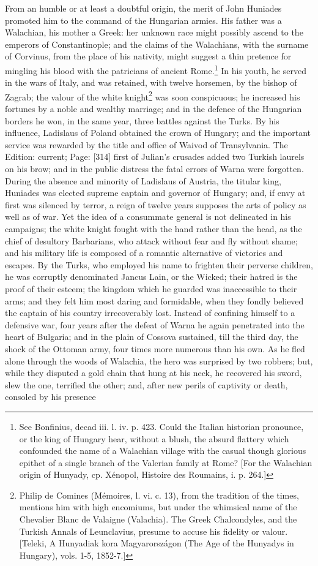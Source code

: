 From an humble or at least a doubtful origin, the merit of John Huniades promoted him to the command of the Hungarian armies. His father was a Walachian, his mother a Greek: her unknown race might possibly ascend to the emperors of Constantinople; and the claims of the Walachians, with the surname of Corvinus, from the place of his nativity, might suggest a thin pretence for mingling his blood with the patricians of ancient Rome.\footnote{See Bonfinius, decad iii. l. iv. p. 423. Could the Italian historian pronounce, or the king of Hungary hear, without a blush, the absurd flattery which confounded the name of a Walachian village with the casual though glorious epithet of a single branch of the Valerian family at Rome? [For the Walachian origin of Hunyady, cp. Xénopol, Histoire des Roumains, i. p. 264.]} In his youth, he served in the wars of Italy, and was retained, with twelve horsemen, by the bishop of Zagrab; the valour of the white knight\footnote{Philip de Comines (Mémoires, l. vi. c. 13), from the tradition of the times, mentions him with high encomiums, but under the whimsical name of the Chevalier Blanc de Valaigne (Valachia). The Greek Chalcondyles, and the Turkish Annals of Leunclavius, presume to accuse his fidelity or valour. [Teleki, A Hunyadiak kora Magyarországon (The Age of the Hunyadys in Hungary), vols. 1-5, 1852-7.]} was soon conspicuous; he increased his fortunes by a noble and wealthy marriage; and in the defence of the Hungarian borders he won, in the same year, three battles against the Turks. By his influence, Ladislaus of Poland obtained the crown of Hungary; and the important service was rewarded by the title and office of Waivod of Transylvania. The Edition: current; Page: [314] first of Julian\texthebrew{}’s crusades added two Turkish laurels on his brow; and in the public distress the fatal errors of Warna were forgotten. During the absence and minority of Ladislaus of Austria, the titular king, Huniades was elected supreme captain and governor of Hungary; and, if envy at first was silenced by terror, a reign of twelve years supposes the arts of policy as well as of war. Yet the idea of a consummate general is not delineated in his campaigns; the white knight fought with the hand rather than the head, as the chief of desultory Barbarians, who attack without fear and fly without shame; and his military life is composed of a romantic alternative of victories and escapes. By the Turks, who employed his name to frighten their perverse children, he was corruptly denominated Jancus Lain, or the Wicked; their hatred is the proof of their esteem; the kingdom which he guarded was inaccessible to their arms; and they felt him most daring and formidable, when they fondly believed the captain of his country irrecoverably lost. Instead of confining himself to a defensive war, four years after the defeat of Warna he again penetrated into the heart of Bulgaria; and in the plain of Cossova sustained, till the third day, the shock of the Ottoman army, four times more numerous than his own. As he fled alone through the woods of Walachia, the hero was surprised by two robbers; but, while they disputed a gold chain that hung at his neck, he recovered his sword, slew the one, terrified the other; and, after new perils of captivity or death, consoled by his presence 